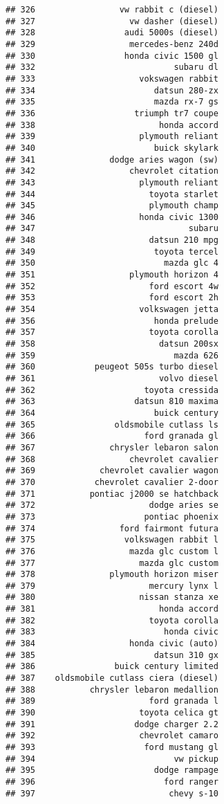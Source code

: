 \documentclass[
]{article}
\begin{document}
\begin{verbatim}
## 326                 vw rabbit c (diesel)
## 327                   vw dasher (diesel)
## 328                  audi 5000s (diesel)
## 329                   mercedes-benz 240d
## 330                  honda civic 1500 gl
## 332                            subaru dl
## 333                     vokswagen rabbit
## 334                        datsun 280-zx
## 335                        mazda rx-7 gs
## 336                    triumph tr7 coupe
## 338                         honda accord
## 339                     plymouth reliant
## 340                        buick skylark
## 341               dodge aries wagon (sw)
## 342                   chevrolet citation
## 343                     plymouth reliant
## 344                       toyota starlet
## 345                       plymouth champ
## 346                     honda civic 1300
## 347                               subaru
## 348                       datsun 210 mpg
## 349                        toyota tercel
## 350                          mazda glc 4
## 351                   plymouth horizon 4
## 352                       ford escort 4w
## 353                       ford escort 2h
## 354                     volkswagen jetta
## 356                        honda prelude
## 357                       toyota corolla
## 358                         datsun 200sx
## 359                            mazda 626
## 360            peugeot 505s turbo diesel
## 361                         volvo diesel
## 362                      toyota cressida
## 363                    datsun 810 maxima
## 364                        buick century
## 365                oldsmobile cutlass ls
## 366                      ford granada gl
## 367               chrysler lebaron salon
## 368                   chevrolet cavalier
## 369             chevrolet cavalier wagon
## 370            chevrolet cavalier 2-door
## 371           pontiac j2000 se hatchback
## 372                       dodge aries se
## 373                      pontiac phoenix
## 374                 ford fairmont futura
## 375                  volkswagen rabbit l
## 376                   mazda glc custom l
## 377                     mazda glc custom
## 378               plymouth horizon miser
## 379                       mercury lynx l
## 380                     nissan stanza xe
## 381                         honda accord
## 382                       toyota corolla
## 383                          honda civic
## 384                   honda civic (auto)
## 385                        datsun 310 gx
## 386                buick century limited
## 387    oldsmobile cutlass ciera (diesel)
## 388           chrysler lebaron medallion
## 389                       ford granada l
## 390                     toyota celica gt
## 391                    dodge charger 2.2
## 392                     chevrolet camaro
## 393                      ford mustang gl
## 394                            vw pickup
## 395                        dodge rampage
## 396                          ford ranger
## 397                           chevy s-10
\end{verbatim}
\end{document}
